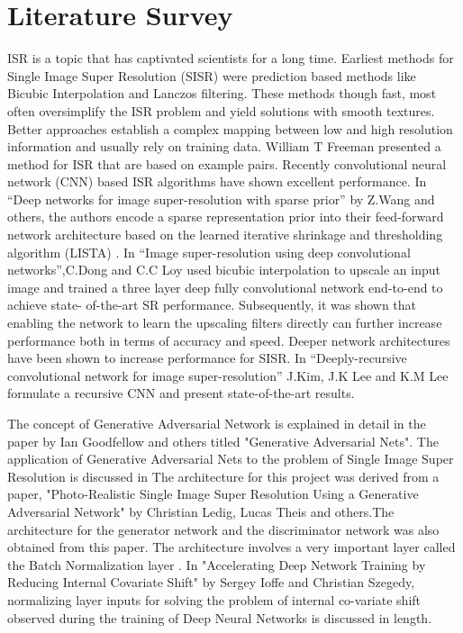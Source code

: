 \chapter{Literature Survey}
ISR is a topic that has captivated scientists for a long time. Earliest methods for Single Image Super Resolution (SISR) were prediction based methods like Bicubic Interpolation and Lanczos filtering. These methods though fast, most often oversimplify the ISR problem and yield solutions with smooth textures. Better approaches establish a complex mapping between low and high resolution information and usually rely on training data. William T Freeman presented a method for ISR that are based on example pairs. Recently convolutional neural network (CNN) based ISR algorithms have shown excellent performance. In “Deep networks
for image super-resolution with sparse prior” by Z.Wang and others, the authors encode a sparse representation prior into their feed-forward network architecture based on the learned iterative shrinkage and thresholding algorithm (LISTA) . In “Image super-resolution
using deep convolutional networks”,C.Dong and C.C Loy used bicubic interpolation to upscale an input image and trained a three layer deep fully convolutional network end-to-end to achieve state- of-the-art SR performance. Subsequently, it was shown that enabling the network to learn the upscaling filters directly can further increase performance both in terms of accuracy and speed. Deeper network architectures have been shown to increase performance for SISR. In “Deeply-recursive convolutional network for image super-resolution” J.Kim, J.K Lee and K.M Lee formulate a recursive CNN and present state-of-the-art results.

The concept of Generative Adversarial Network is explained in detail in the paper by Ian Goodfellow and others titled "Generative Adversarial Nets". The application of Generative Adversarial Nets to the problem of Single Image Super Resolution is discussed in The architecture for this project was derived from a paper, "Photo-Realistic Single Image Super Resolution Using a Generative Adversarial Network" by Christian Ledig, Lucas Theis and others.The architecture for the generator network and the discriminator network was also obtained from this paper. The architecture involves a very important layer called the Batch Normalization layer . In "Accelerating Deep Network Training by Reducing Internal Covariate Shift" by Sergey Ioffe and Christian Szegedy, normalizing layer inputs for solving the problem of internal co-variate shift observed during the training of Deep Neural Networks is discussed in length.
 
